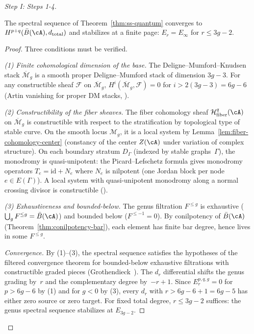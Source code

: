 \begin{proof}[Step I: Steps 1-4]
\begin{lemma}
\label{lem:quantum-ss-convergence}
The spectral sequence of
Theorem~\textup{\ref{thm:ss-quantum}} converges to
$H^{p+q}(\bar{B}(\cA), d_{\mathrm{total}})$ and stabilizes
at a finite page: $E_r = E_\infty$ for $r \le 3g - 2$.
\end{lemma}

\begin{proof}
Three conditions must be verified.

\emph{(1) Finite cohomological dimension of the base.}
The Deligne--Mumford--Knudsen stack
$\overline{\mathcal{M}}_g$ is a smooth proper
Deligne--Mumford stack of dimension $3g - 3$.  For any
constructible sheaf $\mathcal{F}$ on
$\overline{\mathcal{M}}_g$,
$H^i(\overline{\mathcal{M}}_g, \mathcal{F}) = 0$ for
$i > 2(3g-3) = 6g - 6$
(Artin vanishing for proper DM stacks,
\cite[\S4.1]{Olsson16}).

\emph{(2) Constructibility of the fiber sheaves.}
The fiber cohomology sheaf
$\mathcal{H}^q_{\mathrm{fiber}}(\cA)$ on
$\overline{\mathcal{M}}_g$ is constructible with respect to
the stratification by topological type of stable curve.
On the smooth locus $\mathcal{M}_g$, it is a local system
by Lemma~\ref{lem:fiber-cohomology-center} (constancy of
the center $Z(\cA)$ under variation of complex structure).
On each boundary stratum $D_\Gamma$
(indexed by stable graphs~$\Gamma$), the monodromy
is quasi-unipotent: the Picard--Lefschetz formula gives
monodromy operators $T_e = \mathrm{id} + N_e$ where $N_e$
is nilpotent (one Jordan block per node
$e \in E(\Gamma)$).  A local system with quasi-unipotent
monodromy along a normal crossing divisor is constructible
(\cite[\S8.1]{KashiwaraSchapira}).

\emph{(3) Exhaustiveness and bounded-below.}
The genus filtration $F^{\le g}$ is exhaustive
($\bigcup_g F^{\le g} = \bar{B}(\cA)$) and bounded below
($F^{\le -1} = 0$).  By conilpotency of $\bar{B}(\cA)$
(Theorem~\ref{thm:conilpotency-bar}), each element has
finite bar degree, hence lives in some $F^{\le g}$.

\emph{Convergence.}  By (1)--(3), the spectral sequence
satisfies the hypotheses of the filtered convergence theorem
for bounded-below exhaustive filtrations with constructible
graded pieces
(Grothendieck~\cite[\S II.4.17]{Tohoku}).  The $d_r$
differential shifts the genus grading by~$r$ and the
complementary degree by~$-r+1$.  Since $E_r^{p,q,g} = 0$
for $p > 6g - 6$ by (1) and for $g < 0$ by (3), every
$d_r$ with $r > 6g - 6 + 1 = 6g - 5$ has either zero source
or zero target.  For fixed total degree, $r \le 3g - 2$
suffices: the genus spectral sequence stabilizes
at $E_{3g-2}$.
\end{proof}


\end{proof}
